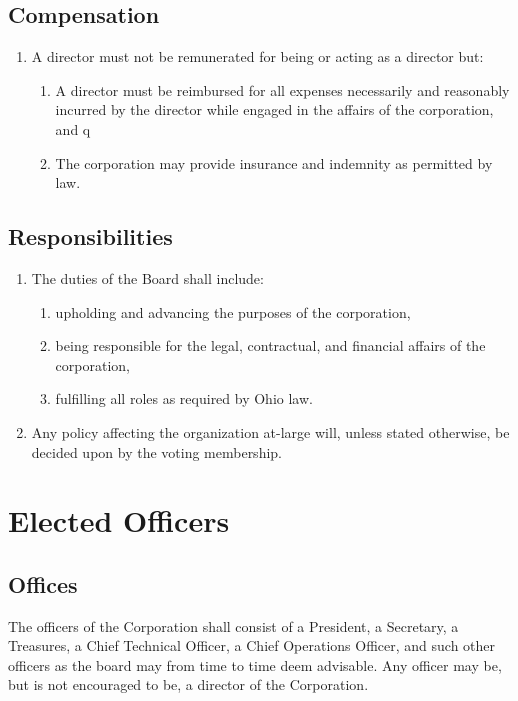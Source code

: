 \documentclass{article}
\begin{document}
\subsection{Compensation}
\begin{enumerate}
  \item A director must not be remunerated for being or acting as a director but:
  \begin{enumerate}
    \item A director must be reimbursed for all expenses necessarily and
    reasonably incurred by the director while engaged in the affairs of the corporation, and
q    \item The corporation may provide insurance and indemnity as permitted by
    law.
  \end{enumerate}
\end{enumerate}
\subsection{Responsibilities}
\begin{enumerate}
  \item The duties of the Board shall include:
  \begin{enumerate}
    \item upholding and advancing the purposes of the corporation,
    \item being responsible for the legal, contractual, and financial affairs of
    the corporation,
    \item fulfilling all roles as required by Ohio law.
  \end{enumerate}
  \item Any policy affecting the organization at-large will, unless stated
  otherwise, be decided upon by the voting membership.
\end{enumerate}
\section{Elected Officers}
\subsection{Offices}
The officers of the Corporation shall consist of a President, a Secretary, a Treasures, a 
Chief Technical Officer, a Chief Operations Officer, and such other officers as the board 
may from time to time deem advisable.  Any officer may be, but is not encouraged to be, a 
director of the Corporation.
\end{document}
